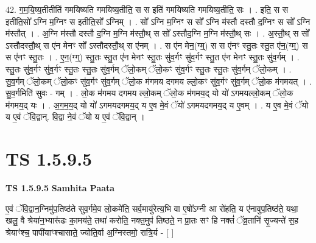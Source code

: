 \documentclass[17pt]{extarticle}
\begin{document}
42. ग॒म॒यि॒ष्य॒तीतीति॑ गमयिष्यति गमयिष्य॒तीति॒ स स इति॑ गमयिष्यति गमयिष्य॒तीति॒ सः । . इति॒ स स इतीति॒सो᳚ ऽग्नि म॒ग्निꣳ स इतीति॒सो᳚ ऽग्निम् । . सो᳚ ऽग्नि म॒ग्निꣳ स सो᳚ ऽग्नि म॑स्तौ दस्तौ द॒ग्निꣳ स सो᳚ ऽग्नि म॑स्तौत् । . अ॒ग्नि म॑स्तौ दस्तौ द॒ग्नि म॒ग्नि म॑स्तौ॒थ् स सो᳚ ऽस्तौद॒ग्नि म॒ग्नि म॑स्तौ॒थ् सः । . अ॒स्तौ॒थ् स सो᳚ ऽस्तौदस्तौ॒थ् स ए॑न मेनꣳ सो᳚ ऽस्तौदस्तौ॒थ् स ए॑नम् । . स ए॑न मेन॒(ग्म्॒) स स ए॑नꣳ स्तु॒तः स्तु॒त ए॑न॒(ग्म्॒) स स ए॑नꣳ स्तु॒तः । . ए॒न॒(ग्ग्॒) स्तु॒तः स्तु॒त ए॑न मेनꣳ स्तु॒तः सु॑व॒र्गꣳ सु॑व॒र्गꣳ स्तु॒त ए॑न मेनꣳ स्तु॒तः सु॑व॒र्गम् । . स्तु॒तः सु॑व॒र्गꣳ सु॑व॒र्गꣳ स्तु॒तः स्तु॒तः सु॑व॒र्गम् ॅलो॒कम् ॅलो॒कꣳ सु॑व॒र्गꣳ स्तु॒तः स्तु॒तः सु॑व॒र्गम् ॅलो॒कम् । . सु॒व॒र्गम् ॅलो॒कम् ॅलो॒कꣳ सु॑व॒र्गꣳ सु॑व॒र्गम् ॅलो॒क म॑गमय दगमय ल्लो॒कꣳ सु॑व॒र्गꣳ सु॑व॒र्गम् ॅलो॒क म॑गमयत् । . सु॒व॒र्गमिति॑ सुवः - गम् । . लो॒क म॑गमय दगमय ल्लो॒कम् ॅलो॒क म॑गमय॒द् यो यो॑ ऽगमयल्लो॒कम् ॅलो॒क म॑गमय॒द् यः । . अ॒ग॒म॒य॒द् यो यो॑ ऽगमयदगमय॒द् य ए॒व मे॒वं ॅयो॑ ऽगमयदगमय॒द् य ए॒वम् । . य ए॒व मे॒वं ॅयो य ए॒वं ॅवि॒द्वान्. वि॒द्वा ने॒वं ॅयो य ए॒वं ॅवि॒द्वान् । \newline
\pagebreak
{}
\section*{ TS 1.5.9.5 }

\textbf{TS 1.5.9.5 } \newline
\textbf{Samhita Paata} \newline

ए॒वं ॅवि॒द्वान॒ग्निमु॑प॒तिष्ठ॑ते सुव॒र्गमे॒व लो॒कमे॑ति॒ सर्व॒मायु॑रेत्य॒भि वा ए॒षो᳚ऽग्नी आ रो॑हति॒ य ए॑नावुप॒तिष्ठ॑ते॒ यथा॒ खलु॒ वै श्रेया॑न॒भ्यारू॑ढः का॒मय॑ते॒ तथा॑ करोति॒ नक्त॒मुप॑ तिष्ठते॒ न प्रा॒तः सꣳ हि नक्तं॑ ॅव्र॒तानि॑ सृ॒ज्यन्ते॑ स॒ह श्रेयाꣳ॑श्च॒ पापी॑याꣳश्चासाते॒ ज्योति॒र्वा अ॒ग्निस्तमो॒ रात्रि॒र्य - [ ] \newline
\end{document}
